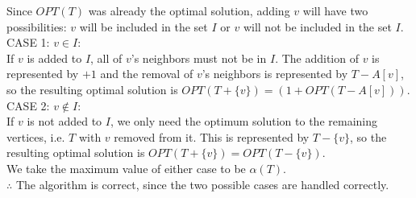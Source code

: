 \documentclass[11pt,letterpaper]{article}
\newcommand\tab[1][1cm]{\hspace*{#1}}
\begin{document}
\tab Since $OPT(T)$ was already the optimal solution, adding $v$ will have two possibilities: $v$ will be included in the set $I$ or $v$ will not be included in the set $I$. \\
\tab CASE 1: $v \in I$: \\
\tab \tab If $v$ is added to $I$, all of $v$'s neighbors must not be in $I$. The addition of $v$ is represented by $+1$ and the removal of $v$'s neighbors is represented by $T-A[v]$, so the resulting optimal solution is $OPT(T+\{v\})=(1+OPT(T-A[v]))$. \\
\tab CASE 2: $v \not \in I$: \\
\tab \tab If $v$ is not added to $I$, we only need the optimum solution to the remaining vertices, i.e. $T$ with $v$ removed from it. This is represented by $T-\{v\}$, so the resulting optimal solution is $OPT(T+\{v\})=OPT(T-\{v\})$. \\
\tab We take the maximum value of either case to be $\alpha(T)$. \\
$\therefore$ The algorithm is correct, since the two possible cases are handled correctly. \\
\end{document}
